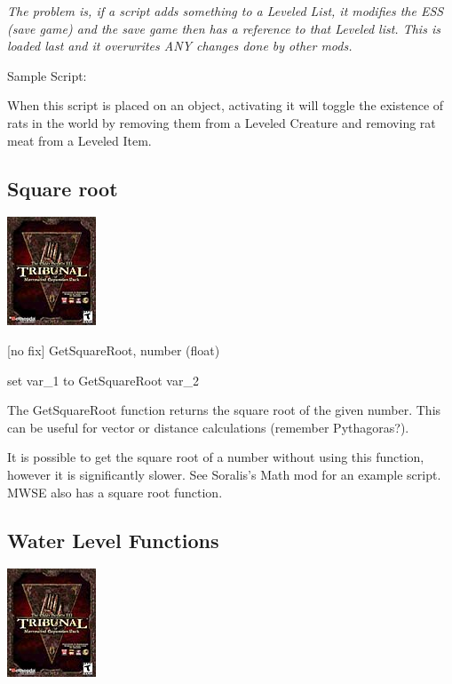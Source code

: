 \documentclass[
]{article}
\begin{document}
\emph{\hfill\break
The problem is, if a script adds something to a Leveled List, it
modifies the ESS (save game) and the save game then has a reference to
that Leveled list. This is loaded last and it overwrites ANY changes
done by other mods.}

Sample Script:

When this script is placed on an object, activating it will toggle the
existence of rats in the world by removing them from a Leveled Creature
and removing rat meat from a Leveled Item.



\hypertarget{square-root}{%
\subsection{Square root}\label{square-root}}

\includegraphics{media/image6.png}

{[}no fix{]} GetSquareRoot, number (float)

set var\_1 to GetSquareRoot var\_2

The GetSquareRoot function returns the square root of the given number.
This can be useful for vector or distance calculations (remember
Pythagoras?).

It is possible to get the square root of a number without using this
function, however it is significantly slower. See Soralis's Math mod for
an example script. MWSE also has a square root function.

\hypertarget{water-level-functions}{%
\subsection{Water Level Functions}\label{water-level-functions}}

\includegraphics{media/image6.png}
\end{document}

